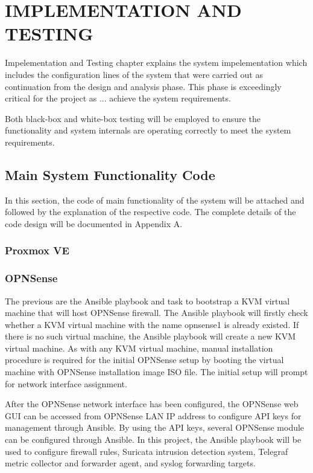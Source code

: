 \documentclass[../index.tex]{subfiles}
\begin{document}
\chapter{IMPLEMENTATION AND TESTING}

Impelementation and Testing chapter explains the system impelementation which includes the
configuration lines of the system that were carried out as continuation from the design and analysis
phase. This phase is exceedingly critical for the project as ... achieve the system requirements.

Both black-box and white-box testing will be employed to ensure the functionality and system
internals are operating correctly to meet the system requirements.

\section{Main System Functionality Code}

In this section, the code of main functionality of the system will be attached and followed by the
explanation of the respective code. The complete details of the code design will be documented in
Appendix A.

\subsection{Proxmox VE}


\subsection{OPNSense}

The previous are the Ansible playbook and task to bootstrap a KVM virtual machine that will host
OPNSense firewall. The Ansible playbook will firstly check whether a KVM virtual machine with the
name opnsense1 is already existed. If there is no such virtual machine, the Ansible playbook will
create a new KVM virtual machine. As with any KVM virtual machine, manual installation procedure is
required for the initial OPNSense setup by booting the virtual machine with OPNSense installation
image ISO file. The initial setup will prompt for network interface assignment.

After the OPNSense network interface has been configured, the OPNSense web GUI can be accessed from
OPNSense LAN IP address to configure API keys for management through Ansible. By using the API keys,
several OPNSense module can be configured through Ansible. In this project, the Ansible playbook
will be used to configure firewall rules, Suricata intrusion detection system, Telegraf metric
collector and forwarder agent, and syslog forwarding targets. 
\end{document}

